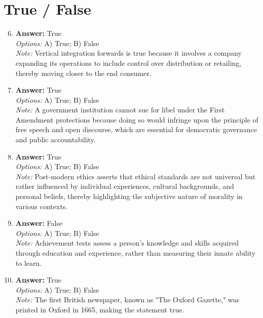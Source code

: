 \documentclass[12pt]{article}
\begin{document}
\section*{True / False}
\begin{enumerate}[label=\arabic*.]
\setcounter{enumi}{5}
\item \textbf{Answer:} True
\\ \textit{Options:} A) True; B) False
\\ \textit{Note:} Vertical integration forwards is true because it involves a company expanding its operations to include control over distribution or retailing, thereby moving closer to the end consumer.
\item \textbf{Answer:} True
\\ \textit{Options:} A) True; B) False
\\ \textit{Note:} A government institution cannot sue for libel under the First Amendment protections because doing so would infringe upon the principle of free speech and open discourse, which are essential for democratic governance and public accountability.
\item \textbf{Answer:} True
\\ \textit{Options:} A) True; B) False
\\ \textit{Note:} Post-modern ethics asserts that ethical standards are not universal but rather influenced by individual experiences, cultural backgrounds, and personal beliefs, thereby highlighting the subjective nature of morality in various contexts.
\item \textbf{Answer:} False
\\ \textit{Options:} A) True; B) False
\\ \textit{Note:} Achievement tests assess a person's knowledge and skills acquired through education and experience, rather than measuring their innate ability to learn.
\item \textbf{Answer:} True
\\ \textit{Options:} A) True; B) False
\\ \textit{Note:} The first British newspaper, known as "The Oxford Gazette," was printed in Oxford in 1665, making the statement true.
\end{enumerate}
\end{document}
